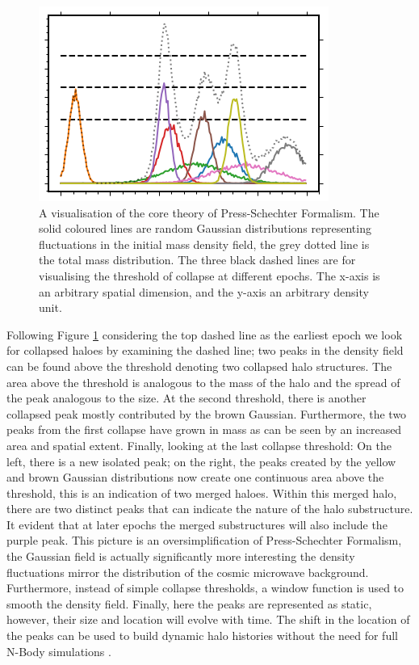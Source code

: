 \begin{figure}[h]
    \centering
    \includegraphics[width = \linewidth]{Figures/Chapter1/PS_Cartoon.png}
    \caption{A visualisation of the core theory of Press-Schechter Formalism. The solid coloured lines are random Gaussian distributions representing fluctuations in the initial mass density field, the grey dotted line is the total mass distribution. The three black dashed lines are for visualising the threshold of collapse at different epochs. The x-axis is an arbitrary spatial dimension, and the y-axis an arbitrary density unit.}
    \label{fig:PS_Cartoon}
\end{figure}

Following Figure \ref{fig:PS_Cartoon} considering the top dashed line as the earliest epoch we look for collapsed haloes by examining the dashed line; two peaks in the density field can be found above the threshold denoting two collapsed halo structures. The area above the threshold is analogous to the mass of the halo and the spread of the peak analogous to the size. At the second threshold, there is another collapsed peak mostly contributed by the brown Gaussian. Furthermore, the two peaks from the first collapse have grown in mass as can be seen by an increased area and spatial extent. Finally, looking at the last collapse threshold: On the left, there is a new isolated peak; on the right, the peaks created by the yellow and brown Gaussian distributions now create one continuous area above the threshold, this is an indication of two merged haloes. Within this merged halo, there are two distinct peaks that can indicate the nature of the halo substructure. It evident that at later epochs the merged substructures will also include the purple peak. This picture is an oversimplification of Press-Schechter Formalism, the Gaussian field is actually significantly more interesting the density fluctuations mirror the distribution of the cosmic microwave background. Furthermore, instead of simple collapse thresholds, a window function is used to smooth the density field. Finally, here the peaks are represented as static, however, their size and location will evolve with time. The shift in the location of the peaks can be used to build dynamic halo histories without the need for full N-Body simulations \cite{Voivodic2019ExcursionCatalogues}.

